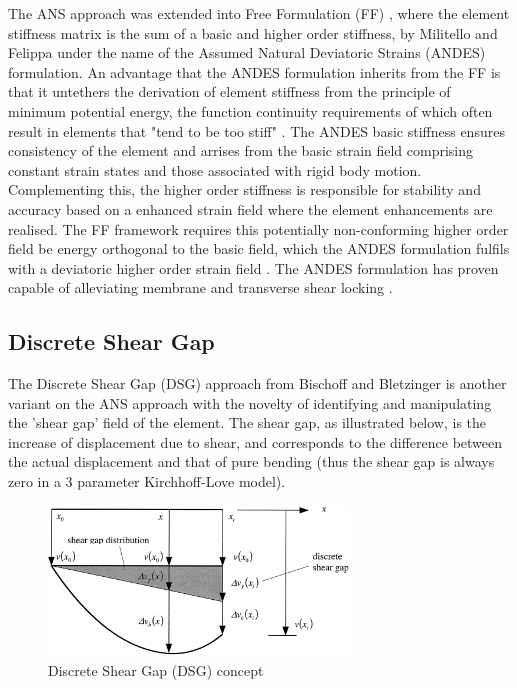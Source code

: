 The ANS approach was extended into Free Formulation (FF) \cite{Bergan84}, where the element stiffness matrix is the sum of a basic and higher order stiffness, by Militello and Felippa \cite{FELIPPA1990} under the name of the Assumed Natural Deviatoric Strains (ANDES) formulation. An advantage that the ANDES formulation inherits from the FF is that it untethers the derivation of element stiffness from the principle of minimum potential energy, the function continuity requirements of which often result in elements that "tend to be too stiff" \cite{Bergan84}. The ANDES basic stiffness ensures consistency of the element and arrises from the basic strain field comprising constant strain states and those associated with rigid body motion. Complementing this, the higher order stiffness is responsible for stability and accuracy \cite{Felippa2003} based on a enhanced strain field where the element enhancements are realised. The FF framework requires this potentially non-conforming higher order field be energy orthogonal to the basic field, which the ANDES formulation fulfils with a deviatoric higher order strain field \cite{felippa2002fitting}.  The ANDES formulation has proven capable of alleviating membrane and transverse shear locking \cite{Mostafa11}.

\subsection{Discrete Shear Gap}

The Discrete Shear Gap (DSG) approach from Bischoff and Bletzinger \cite{Ble00} \cite{Bis04} is another variant on the ANS approach with the novelty of identifying and manipulating the 'shear gap' field of the element. The shear gap, as illustrated below, is the increase of displacement due to shear, and corresponds to the difference between the actual displacement and that of pure bending (thus the shear gap is always zero in a 3 parameter Kirchhoff-Love model).

\begin{figure}[H]
	\centering
	\def\svgwidth{\columnwidth}
	\includegraphics[width=8cm]{images/DSG.png}
	\caption{Discrete Shear Gap (DSG) concept \cite{Ble00}}
	\label{ansexample}
\end{figure}

